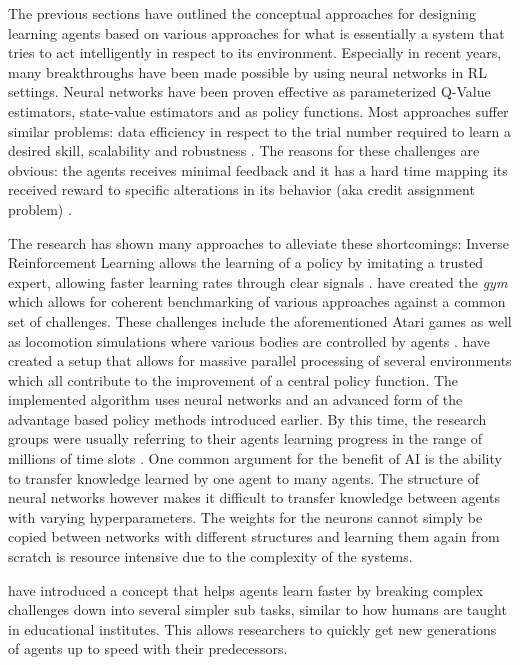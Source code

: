 The previous sections have outlined the conceptual approaches for designing learning agents based on various approaches
for what is essentially a system that tries to act intelligently in respect to its environment. Especially in recent
years, many breakthroughs have been made possible by using neural networks in \ac{RL} settings. Neural networks have
been proven effective as
parameterized Q-Value estimators, state-value estimators and as policy functions. Most approaches suffer similar
problems: data efficiency in respect to the trial number required to learn a desired skill, scalability and robustness
\citep{proximalpolicyopt}. The reasons for these challenges are obvious: the agents receives minimal feedback and it has
a hard time mapping its received reward to specific alterations in its behavior (aka credit assignment problem)
\citep{arulkumaran2017brief}.

The research has shown many approaches to alleviate these shortcomings: Inverse Reinforcement Learning allows the
learning of a policy by imitating a trusted expert, allowing faster learning rates through clear signals
\citep{NG2000InvReinf}. \citet{brockman2016openai} have created the \emph{gym} which allows for coherent benchmarking of
various approaches against a common set of challenges. These challenges include the aforementioned Atari games as well
as locomotion simulations where various bodies are controlled by agents \cite[]{heess2017emergence}.
\citet{hafner2017agents} have created a setup that allows for massive parallel processing of several environments which
all contribute to the improvement of a central policy function. The implemented algorithm uses neural networks and an
advanced form of the advantage based policy methods introduced earlier. By this time, the research groups were usually
referring to their agents learning progress in the range of millions of time slots \citep{proximalpolicyopt}. One common
argument for the benefit of \ac{AI} is the ability to transfer knowledge learned by one agent to many agents. The
structure of neural networks however makes it difficult to transfer knowledge between agents with varying
hyperparameters. The weights for the neurons cannot simply be copied between networks with different structures and
learning them again from scratch is resource intensive due to the complexity of the systems.

\citet{matiisen2017teacher} have introduced a concept that helps agents learn faster by breaking complex challenges down
into several simpler sub tasks, similar to how humans are taught in educational institutes. This allows researchers to
quickly get new generations of agents up to speed with their predecessors.

